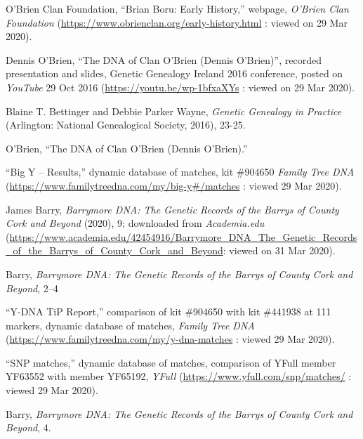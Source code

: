 \begin{thebibliography}{999}
O'Brien Clan Foundation, ``Brian Boru: Early History,'' webpage, \textit{O'Brien Clan Foundation} (\url{https://www.obrienclan.org/early-history.html} : viewed on 29 Mar 2020).

Dennis O'Brien, ``The DNA of Clan O'Brien (Dennis O'Brien)'', recorded presentation and slides, Genetic Genealogy Ireland 2016 conference, posted on \textit{YouTube} 29 Oct 2016 (\url{https://youtu.be/wp-1bfxaXYs} : viewed on 29 Mar 2020).	

Blaine T. Bettinger and Debbie Parker Wayne, \textit{Genetic Genealogy in Practice} (Arlington: National Genealogical Society, 2016), 23-25.

O'Brien, ``The DNA of Clan O'Brien (Dennis O'Brien).''

``Big Y -- Results,'' dynamic database of matches, kit \#904650 \textit{Family Tree DNA} (\url{https://www.familytreedna.com/my/big-y\#/matches} : viewed 29 Mar 2020).

James Barry, \textit{Barrymore DNA: The Genetic Records of the Barrys of County Cork and Beyond} (2020), 9; downloaded from \textit{Academia.edu} (\url{https://www.academia.edu/42454916/Barrymore_DNA_The_Genetic_Records_of_the_Barrys_of_County_Cork_and_Beyond}: viewed on 31 Mar 2020).

Barry, \textit{Barrymore DNA: The Genetic Records of the Barrys of County Cork and Beyond}, 2--4

``Y-DNA TiP Report,'' comparison of kit \#904650 with kit \#441938 at 111 markers, dynamic database of matches, \textit{Family Tree DNA} (\url{https://www.familytreedna.com/my/y-dna-matches} : viewed 29 Mar 2020).

``SNP matches,'' dynamic database of matches, comparison of YFull member YF63552 with member YF65192, \textit{YFull} (\url{https://www.yfull.com/snp/matches/} : viewed 29 Mar 2020).

Barry, \textit{Barrymore DNA: The Genetic Records of the Barrys of County Cork and Beyond}, 4.

\end{thebibliography}